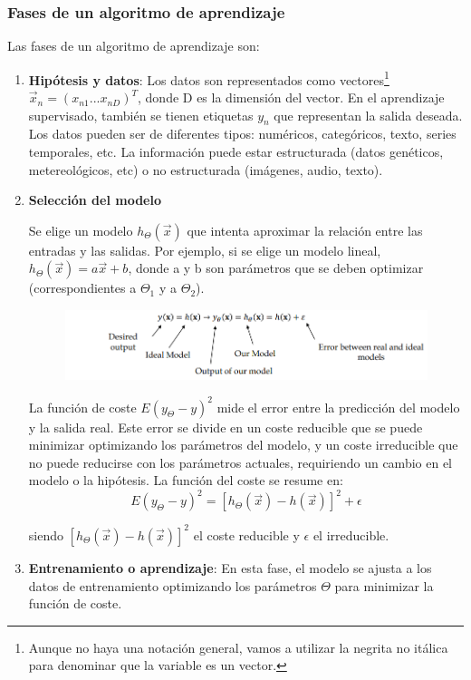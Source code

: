 \subsubsection{Fases de un algoritmo de aprendizaje}
Las fases de un algoritmo de aprendizaje son:
\begin{enumerate}
\item \textbf{Hipótesis y datos}: Los datos son representados como vectores\footnote{Aunque no haya una notación general, vamos a utilizar la negrita no itálica para denominar que la variable es un vector. }  $\vec{x}_n = (x_{n1} ... x_{nD})^T$, donde D es la dimensión del vector. En el aprendizaje supervisado, también se tienen etiquetas $y_n$ que representan la salida deseada. Los datos pueden ser de diferentes tipos: numéricos, categóricos, texto, series temporales, etc. La información puede estar estructurada (datos genéticos, metereológicos, etc) o no estructurada (imágenes, audio, texto).

\item \textbf{Selección del modelo}

Se elige un modelo $h_{\Theta}(\vec{x})$ que intenta aproximar la relación entre las entradas y las salidas. Por ejemplo, si se elige un modelo lineal, $h_{\Theta}(\vec{x}) = a\vec{x} + b$, donde a y b son parámetros que se deben optimizar (correspondientes a $\Theta_1$ y a $\Theta_2$). 

\begin{figure}[h]
\centering
\includegraphics[width = \textwidth]{figs/model-htheta.png}
\end{figure}

La función de coste $E(y_{\Theta} - y )^2$ mide el error entre la predicción del modelo y la salida real. Este error se divide en un coste reducible que se puede minimizar optimizando los parámetros del modelo, y un coste irreducible que no puede reducirse con los parámetros actuales, requiriendo un cambio en el modelo o la hipótesis. La función del coste se resume en:
$$E(y_{\Theta} - y)^2 = [h_{\Theta}(\vec{x}) - h(\vec{x})]^2 + \epsilon$$

siendo $ [h_{\Theta}(\vec{x}) - h(\vec{x})]^2$ el coste reducible y $\epsilon$ el irreducible. 

\item \textbf{Entrenamiento o aprendizaje}: En esta fase, el modelo se ajusta a los datos de entrenamiento optimizando los parámetros $\Theta$ para minimizar la función de coste.


\end{enumerate}
